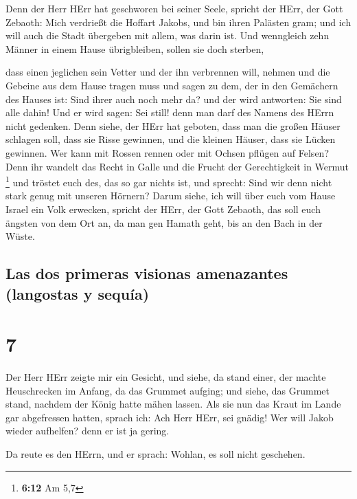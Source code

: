  Denn der Herr HErr hat geschworen bei seiner Seele,
spricht der HErr, der Gott Zebaoth: Mich verdrießt die Hoffart Jakobs,
und bin ihren Palästen gram; und ich will auch die Stadt übergeben mit
allem, was darin ist.  Und wenngleich zehn Männer in einem
Hause übrigbleiben, sollen sie doch sterben,

 dass einen jeglichen sein Vetter und der ihn verbrennen
will, nehmen und die Gebeine aus dem Hause tragen muss und sagen zu dem,
der in den Gemächern des Hauses ist: Sind ihrer auch noch mehr da? und
der wird antworten: Sie sind alle dahin! Und er wird sagen: Sei still!
denn man darf des Namens des HErrn nicht gedenken.  Denn
siehe, der HErr hat geboten, dass man die großen Häuser schlagen soll,
dass sie Risse gewinnen, und die kleinen Häuser, dass sie Lücken
gewinnen.  Wer kann mit Rossen rennen oder mit Ochsen
pflügen auf Felsen? Denn ihr wandelt das Recht in Galle und die Frucht
der Gerechtigkeit in Wermut \footnote{\textbf{6:12} Am 5,7}
 und tröstet euch des, das so gar nichts ist, und
sprecht: Sind wir denn nicht stark genug mit unseren Hörnern?
 Darum siehe, ich will über euch vom Hause Israel ein
Volk erwecken, spricht der HErr, der Gott Zebaoth, das soll euch ängsten
von dem Ort an, da man gen Hamath geht, bis an den Bach in der Wüste.

\hypertarget{las-dos-primeras-visionas-amenazantes-langostas-y-sequuxeda}{%
\subsection{Las dos primeras visionas amenazantes (langostas y
sequía)}\label{las-dos-primeras-visionas-amenazantes-langostas-y-sequuxeda}}

\hypertarget{section-6}{%
\section{7}\label{section-6}}

 Der Herr HErr zeigte mir ein Gesicht, und siehe, da stand
einer, der machte Heuschrecken im Anfang, da das Grummet aufging; und
siehe, das Grummet stand, nachdem der König hatte mähen lassen.
 Als sie nun das Kraut im Lande gar abgefressen hatten,
sprach ich: Ach Herr HErr, sei gnädig! Wer will Jakob wieder aufhelfen?
denn er ist ja gering.

 Da reute es den HErrn, und er sprach: Wohlan, es soll
nicht geschehen.

